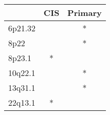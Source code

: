 \begin{tabular}{lcc}
\toprule
{} & CIS & Primary \\
\midrule
6p21.32 &     &       * \\
8p22    &     &       * \\
8p23.1  &   * &         \\
10q22.1 &     &       * \\
13q31.1 &     &       * \\
22q13.1 &   * &         \\
\bottomrule
\end{tabular}
